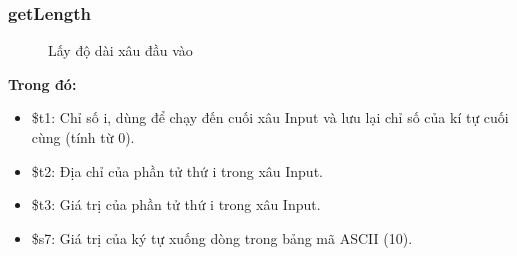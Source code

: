 \documentclass[a4paper,12pt]{article}
\begin{document}
\subsubsection{getLength}
\begin{figure}[!h]
	\centerline{}
	\label{fig:bai6}
\end{figure}
\begin{figure}[!h]
	\centerline{}
	\caption{Lấy độ dài xâu đầu vào}
	\label{fig:bai6}
\end{figure}
\clearpage
\noindent
\textbf{Trong đó: }
\begin{itemize}
    \item \$t1: Chỉ số i, dùng để chạy đến cuối xâu Input và lưu lại chỉ số của kí tự cuối cùng (tính từ 0).
    \item \$t2: Địa chỉ của phần tử thứ i trong xâu Input.
    \item \$t3: Giá trị của phần tử thứ i trong xâu Input.
    \item \$s7: Giá trị của ký tự xuống dòng trong bảng mã ASCII (10).
\end{itemize}
\end{document}
